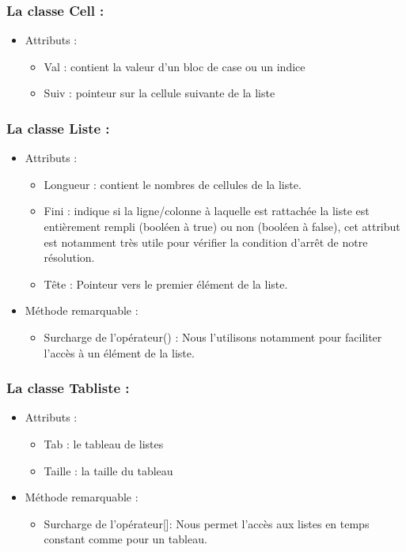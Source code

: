 \documentclass{article}
\begin{document}
\subsubsection{La classe Cell :}
\begin{itemize}
\item Attributs :
\begin{itemize}
\item Val : contient la valeur d'un bloc de case ou un indice
\item Suiv : pointeur sur la cellule suivante de la liste
\end{itemize}
\end{itemize}
\subsubsection{La classe Liste :}
\begin{itemize}
\item Attributs :
\begin{itemize}
\item Longueur : contient le nombres de cellules de la liste.
\item Fini : indique si la ligne/colonne à laquelle est rattachée la liste est entièrement rempli (booléen à true) ou non (booléen à false), cet attribut est
notamment très utile pour vérifier la condition d'arrêt de notre résolution.
\item Tête : Pointeur vers le premier élément de la liste.
\end{itemize}
\item Méthode remarquable :
\begin{itemize}
\item Surcharge de l'opérateur() : Nous l'utilisons notamment pour faciliter l'accès à un élément de la liste.
\end{itemize}
\end{itemize}
\subsubsection{La classe Tabliste :}
\begin{itemize}
\item Attributs :
\begin{itemize}
\item Tab : le tableau de listes
\item Taille : la taille du tableau
\end{itemize}
\item Méthode remarquable :
\begin{itemize}
\item Surcharge de l'opérateur[]: Nous permet l'accès aux listes en temps constant comme pour un tableau.
\end{itemize}
\end{itemize}
\end{document}

